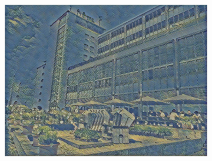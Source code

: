 \begin{figure}[H]
\begin{subfigure}[h]{0.32\textwidth}
        \centering
        \includegraphics[width=\textwidth]{resources/content/experiments/htw-vgg16_the_olive_trees.jpg}
    \end{subfigure}



\end{figure}
